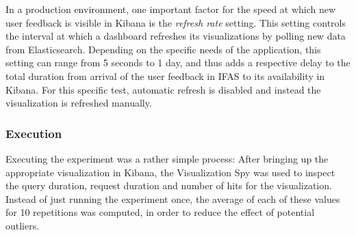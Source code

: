 In a production environment, one important factor for the speed at which new user feedback is visible in Kibana is the \emph{refresh rate} setting.
This setting controls the interval at which a dashboard refreshes its visualizations by polling new data from Elasticsearch.
Depending on the specific needs of the application, this setting can range from 5 seconds to 1 day, and thus adds a respective delay to the total duration from arrival of the user feedback in \ac{IFAS} to its availability in Kibana.
For this specific test, automatic refresh is disabled and instead the visualization is refreshed manually.

%

\subsubsection{Execution}

Executing the experiment was a rather simple process:
After bringing up the appropriate visualization in Kibana, the Visualization Spy was used to inspect the query duration, request duration and number of hits for the visualization.
Instead of just running the experiment once, the average of each of these values for 10 repetitions was computed, in order to reduce the effect of potential outliers.

